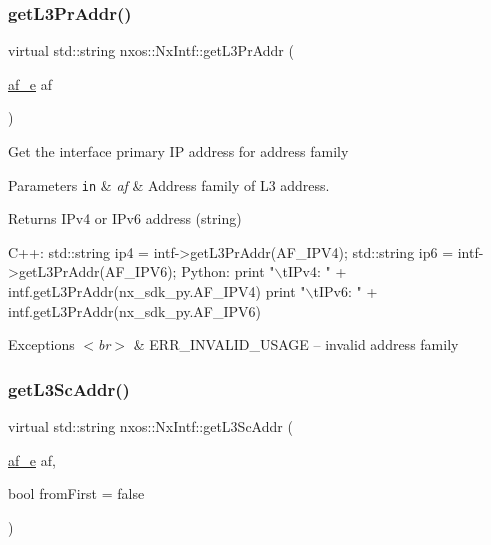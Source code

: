 \subsubsection{\texorpdfstring{get\+L3\+Pr\+Addr()}{getL3PrAddr()}}
{\footnotesize\ttfamily virtual std\+::string nxos\+::\+Nx\+Intf\+::get\+L3\+Pr\+Addr (\begin{DoxyParamCaption}\item[{\mbox{\hyperlink{nx__common_8h_a3a667f48b94db10aa398940dc5bf72d7}{af\+\_\+e}}}]{af }\end{DoxyParamCaption})\hspace{0.3cm}{\ttfamily [pure virtual]}}

Get the interface primary IP address for address family 
\begin{DoxyParams}[1]{Parameters}
\mbox{\tt in}  & {\em af} & Address family of L3 address. \\
\hline
\end{DoxyParams}
\begin{DoxyReturn}{Returns}
I\+Pv4 or I\+Pv6 address (string)
\end{DoxyReturn}

\begin{DoxyCode}
C++:
        std::string ip4 = intf->getL3PrAddr(AF\_IPV4);
        std::string ip6 = intf->getL3PrAddr(AF\_IPV6);
Python:
        print \textcolor{stringliteral}{"\(\backslash\)tIPv4: "} + intf.getL3PrAddr(nx\_sdk\_py.AF\_IPV4)
        print \textcolor{stringliteral}{"\(\backslash\)tIPv6: "} + intf.getL3PrAddr(nx\_sdk\_py.AF\_IPV6)
\end{DoxyCode}



\begin{DoxyExceptions}{Exceptions}
{\em $<$br$>$} & E\+R\+R\+\_\+\+I\+N\+V\+A\+L\+I\+D\+\_\+\+U\+S\+A\+GE -- invalid address family \\
\hline
\end{DoxyExceptions}
\mbox{\label{classnxos_1_1_nx_intf_af0aebadac66f6b4fbe8ddbd567a577b6}} 
\subsubsection{\texorpdfstring{get\+L3\+Sc\+Addr()}{getL3ScAddr()}}
{\footnotesize\ttfamily virtual std\+::string nxos\+::\+Nx\+Intf\+::get\+L3\+Sc\+Addr (\begin{DoxyParamCaption}\item[{\mbox{\hyperlink{nx__common_8h_a3a667f48b94db10aa398940dc5bf72d7}{af\+\_\+e}}}]{af,  }\item[{bool}]{from\+First = {\ttfamily false} }\end{DoxyParamCaption})\hspace{0.3cm}{\ttfamily [pure virtual]}}

